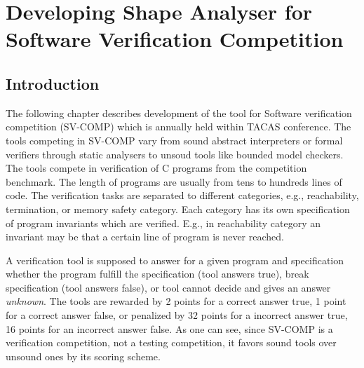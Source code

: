 {

\chapter{Developing Shape Analyser for Software Verification Competition}
\label{ch:svcomp}
\section{Introduction}
The following chapter describes development of the \forester tool \cite{foresterweb}
for Software verification competition \cite{svcompweb} (SV-COMP) which is annually held within TACAS conference.
The tools competing in SV-COMP vary from sound abstract interpreters or formal verifiers through static analysers
to unsoud tools like bounded model checkers.
The tools compete in verification of C programs from the competition benchmark.
The length of programs are usually from tens to hundreds lines of code.
The verification tasks are separated to different categories, e.g., reachability,
termination, or memory safety category.
Each category has its own specification of program invariants which are verified.
E.g., in reachability category an invariant may be that a certain line of program is never reached.

A verification tool is supposed to answer for a given program and specification whether
the program fulfill the specification (tool answers true), break specification (tool answers
false), or tool cannot decide and gives an answer \emph{unknown}.
The tools are rewarded by 2 points for a correct answer true, 1 point for a correct answer false,
or penalized by 32 points for a incorrect answer true, 16 points for an incorrect answer false.
As one can see, since SV-COMP is a verification competition, not a testing competition, it favors
sound tools over unsound ones by its scoring scheme.

}
